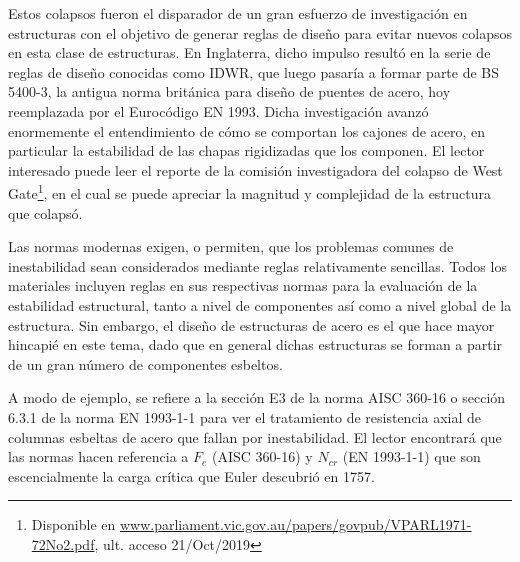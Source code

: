 %
Estos colapsos fueron el disparador de un gran esfuerzo de investigación en estructuras con el objetivo de generar reglas de diseño para evitar nuevos colapsos en esta clase de estructuras. En Inglaterra, dicho impulso resultó en la serie de reglas de diseño conocidas como IDWR, que luego pasaría a formar parte de BS 5400-3, la antigua norma británica para diseño de puentes de acero, hoy reemplazada por el Eurocódigo EN 1993. Dicha investigación avanzó enormemente el entendimiento de cómo se comportan los cajones de acero, en particular la estabilidad de las chapas rigidizadas que los componen. El lector interesado puede leer el reporte de la comisión investigadora del colapso de West Gate\footnote{Disponible en \href{http://www.parliament.vic.gov.au/papers/govpub/VPARL1971-72No2.pdf}{www.parliament.vic.gov.au/papers/govpub/VPARL1971-72No2.pdf}, ult. acceso 21/Oct/2019}, en el cual se puede apreciar la magnitud y complejidad de la estructura que colapsó. 


Las normas modernas exigen, o permiten, que los problemas comunes de inestabilidad sean considerados mediante reglas relativamente sencillas. Todos los materiales incluyen reglas en sus respectivas normas para la evaluación de la estabilidad estructural, tanto a nivel de componentes así como a nivel global de la estructura. Sin embargo, el diseño de estructuras de acero es el que hace mayor hincapié en este tema, dado que en general dichas estructuras se forman a partir de un gran número de componentes esbeltos. 

A modo de ejemplo, se refiere a la sección E3 de la norma AISC 360-16 o sección 6.3.1 de la norma EN 1993-1-1 para ver el tratamiento de resistencia axial de columnas esbeltas de acero que fallan por inestabilidad. El lector encontrará que las normas hacen referencia a $F_e$ (AISC 360-16) y $N_{cr}$ (EN 1993-1-1) que son escencialmente la carga crítica que Euler descubrió en 1757.

